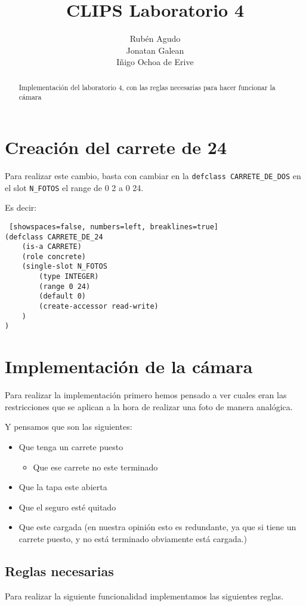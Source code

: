 \documentclass[hidelinks]{scrreprt}
\title{CLIPS Laboratorio 4}
\author{Rub\'{e}n Agudo \\
    Jonatan Galean \\
    I\~{n}igo Ochoa de Erive}
\begin{document}
\maketitle
\tableofcontents

\begin{abstract}
    Implementaci\'{o}n del laboratorio 4, con las reglas
    necesarias para hacer funcionar la c\'{a}mara
\end{abstract}

\chapter{Creaci\'{o}n del carrete de 24}
Para realizar este cambio, basta con cambiar en la \texttt{defclass CARRETE\_DE\_DOS}
en el slot \texttt{N\_FOTOS} el range de 0 2 a 0 24.

Es decir:
\begin{lstlisting} [showspaces=false, numbers=left, breaklines=true]
(defclass CARRETE_DE_24
    (is-a CARRETE)
    (role concrete)
    (single-slot N_FOTOS
        (type INTEGER)
        (range 0 24)
        (default 0)
        (create-accessor read-write)
    )
)
\end{lstlisting}

\chapter{Implementaci\'{o}n de la c\'{a}mara}
Para realizar la implementaci\'{o}n primero hemos pensado a ver cuales eran 
las restricciones que se aplican a la hora de realizar una foto de manera anal\'{o}gica.

Y pensamos que son las siguientes:
\begin{itemize}
    \item Que tenga un carrete puesto
    \begin{itemize}
        \item Que ese carrete no este terminado
    \end{itemize}
    \item Que la tapa este abierta
    \item Que el seguro est\'{e} quitado
    \item Que este cargada (en nuestra opini\'{o}n esto
    es redundante, ya que si tiene un carrete puesto, y no est\'{a} terminado
    obviamente est\'{a} cargada.)
\end{itemize}

\section{Reglas necesarias}
Para realizar la siguiente funcionalidad implementamos las siguientes reglas.
\end{document}
